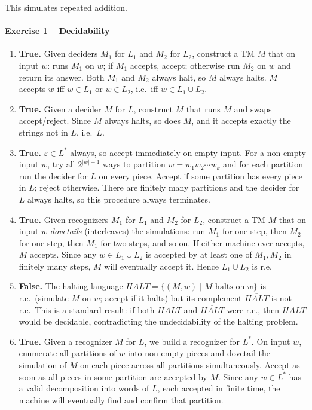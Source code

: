 \documentclass[11pt, a4paper]{article}
\theoremstyle{definition}
\theoremstyle{remark}
\begin{document}
This simulates repeated addition.


\paragraph{Exercise 1 -- Decidability}

\begin{enumerate}
    \item \textbf{True.} Given deciders $M_1$ for $L_1$ and $M_2$ for $L_2$, construct a TM $M$ that on input $w$: runs $M_1$ on $w$; if $M_1$ accepts, accept; otherwise run $M_2$ on $w$ and return its answer. Both $M_1$ and $M_2$ always halt, so $M$ always halts. $M$ accepts $w$ iff $w\in L_1$ or $w\in L_2$, i.e.\ iff $w\in L_1\cup L_2$.

    \item \textbf{True.} Given a decider $M$ for $L$, construct $\overline{M}$ that runs $M$ and swaps accept/reject. Since $M$ always halts, so does $\overline{M}$, and it accepts exactly the strings not in $L$, i.e.\ $\overline{L}$.

    \item \textbf{True.} $\varepsilon\in L^*$ always, so accept immediately on empty input. For a non-empty input $w$, try all $2^{|w|-1}$ ways to partition $w = w_1 w_2 \cdots w_k$ and for each partition run the decider for $L$ on every piece. Accept if some partition has every piece in $L$; reject otherwise. There are finitely many partitions and the decider for $L$ always halts, so this procedure always terminates.

    \item \textbf{True.} Given recognizers $M_1$ for $L_1$ and $M_2$ for $L_2$, construct a TM $M$ that on input $w$ \emph{dovetails} (interleaves) the simulations: run $M_1$ for one step, then $M_2$ for one step, then $M_1$ for two steps, and so on. If either machine ever accepts, $M$ accepts. Since any $w\in L_1\cup L_2$ is accepted by at least one of $M_1, M_2$ in finitely many steps, $M$ will eventually accept it. Hence $L_1\cup L_2$ is r.e.

    \item \textbf{False.} The halting language $\mathit{HALT} = \{(M,w)\mid M \text{ halts on } w\}$ is r.e.\ (simulate $M$ on $w$; accept if it halts) but its complement $\overline{\mathit{HALT}}$ is not r.e.\ This is a standard result: if both $\mathit{HALT}$ and $\overline{\mathit{HALT}}$ were r.e., then $\mathit{HALT}$ would be decidable, contradicting the undecidability of the halting problem.

    \item \textbf{True.} Given a recognizer $M$ for $L$, we build a recognizer for $L^*$. On input $w$, enumerate all partitions of $w$ into non-empty pieces and dovetail the simulation of $M$ on each piece across all partitions simultaneously. Accept as soon as all pieces in some partition are accepted by $M$. Since any $w\in L^*$ has a valid decomposition into words of $L$, each accepted in finite time, the machine will eventually find and confirm that partition.
\end{enumerate}
\end{document}
